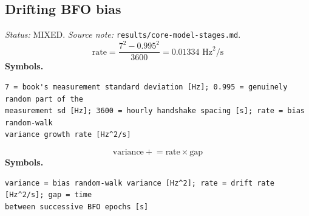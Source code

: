 \documentclass[11pt,a4paper]{article}
\begin{document}
\subsection{Drifting BFO bias}
\noindent\textit{Status:} MIXED. \textit{Source note:} \texttt{results/core-model-stages.md}.
\medskip
\begin{equation}
\text{rate} = \frac{7^2 - 0.995^2}{3600} = 0.01334 \text{ Hz}^2/\text{s}
\end{equation}
\noindent\textbf{Symbols.}
\begin{verbatim}
7 = book's measurement standard deviation [Hz]; 0.995 = genuinely random part of the
measurement sd [Hz]; 3600 = hourly handshake spacing [s]; rate = bias random-walk
variance growth rate [Hz^2/s]
\end{verbatim}
\medskip
\begin{equation}
\text{variance} \mathrel{+}= \text{rate} \times \text{gap}
\end{equation}
\noindent\textbf{Symbols.}
\begin{verbatim}
variance = bias random-walk variance [Hz^2]; rate = drift rate [Hz^2/s]; gap = time
between successive BFO epochs [s]
\end{verbatim}
\medskip
\end{document}
